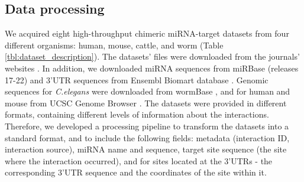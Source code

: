 \documentclass{bmcart}
\begin{document}
\subsection*{Data processing}
We acquired eight high-throughput chimeric miRNA-target datasets from four different organisms: human, mouse, cattle, and worm (Table \ref{tbl:dataset_description}). The datasets' files were downloaded from the journals' websites \cite{scheel2017global, grosswendt2014unambiguous, broughton2016pairing, helwak2013mapping, darnell_moore2015mirna}. In addition, we downloaded miRNA sequences from miRBase (releases 17-22) \cite{kozomara2013mirbase} and 3'UTR sequences from Ensembl Biomart database \cite{smedley2015biomart}. Genomic sequences for \textit{C.elegans} were downloaded from wormBase \cite{lee2017wormbase}, and for human and mouse from UCSC Genome Browser \cite{karolchik2004ucsc}.
The datasets were provided in different formats, containing different levels of information about the interactions. Therefore, we developed a processing pipeline to transform the datasets into a standard format, and to include the following fields: metadata (interaction ID, interaction source), miRNA name and sequence, target site sequence (the site where the interaction occurred), and for sites located at the 3'UTRs - the corresponding 3'UTR sequence and the coordinates of the site within it.
\end{document}
